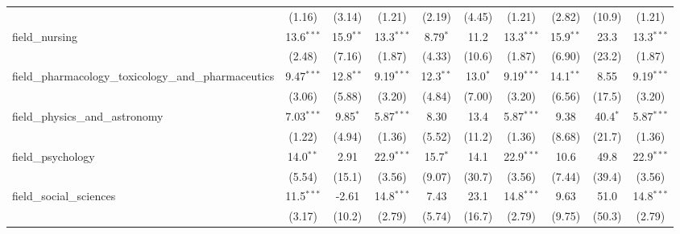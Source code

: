 \begin{tabular}{lccccccccc}
                                                               & (1.16)        & (3.14)        & (1.21)        & (2.19)       & (4.45)       & (1.21)        & (2.82)         & (10.9)         & (1.21)\\   
   field\_nursing                                              & 13.6$^{***}$  & 15.9$^{**}$   & 13.3$^{***}$  & 8.79$^{*}$   & 11.2         & 13.3$^{***}$  & 15.9$^{**}$    & 23.3           & 13.3$^{***}$\\   
                                                               & (2.48)        & (7.16)        & (1.87)        & (4.33)       & (10.6)       & (1.87)        & (6.90)         & (23.2)         & (1.87)\\   
   field\_pharmacology\_toxicology\_and\_pharmaceutics         & 9.47$^{***}$  & 12.8$^{**}$   & 9.19$^{***}$  & 12.3$^{**}$  & 13.0$^{*}$   & 9.19$^{***}$  & 14.1$^{**}$    & 8.55           & 9.19$^{***}$\\   
                                                               & (3.06)        & (5.88)        & (3.20)        & (4.84)       & (7.00)       & (3.20)        & (6.56)         & (17.5)         & (3.20)\\   
   field\_physics\_and\_astronomy                              & 7.03$^{***}$  & 9.85$^{*}$    & 5.87$^{***}$  & 8.30         & 13.4         & 5.87$^{***}$  & 9.38           & 40.4$^{*}$     & 5.87$^{***}$\\   
                                                               & (1.22)        & (4.94)        & (1.36)        & (5.52)       & (11.2)       & (1.36)        & (8.68)         & (21.7)         & (1.36)\\   
   field\_psychology                                           & 14.0$^{**}$   & 2.91          & 22.9$^{***}$  & 15.7$^{*}$   & 14.1         & 22.9$^{***}$  & 10.6           & 49.8           & 22.9$^{***}$\\   
                                                               & (5.54)        & (15.1)        & (3.56)        & (9.07)       & (30.7)       & (3.56)        & (7.44)         & (39.4)         & (3.56)\\   
   field\_social\_sciences                                     & 11.5$^{***}$  & -2.61         & 14.8$^{***}$  & 7.43         & 23.1         & 14.8$^{***}$  & 9.63           & 51.0           & 14.8$^{***}$\\   
                                                               & (3.17)        & (10.2)        & (2.79)        & (5.74)       & (16.7)       & (2.79)        & (9.75)         & (50.3)         & (2.79)\\   

\end{tabular}
